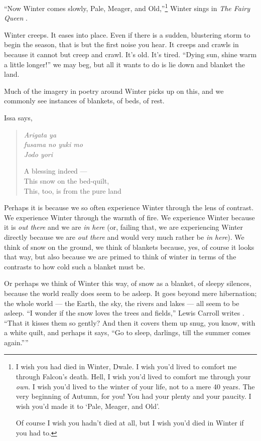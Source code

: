 \documentclass[12pt,oneside]{memoir}
\begin{document}
``Now Winter comes slowly, Pale, Meager, and Old,''\footnote{I wish you had died in Winter, Dwale. I wish you'd lived to comfort me through Falcon's death. Hell, I wish you'd lived to comfort me through your \emph{own}. I wish you'd lived to the winter of your life, not to a mere 40 years. The very beginning of Autumn, for you! You had your plenty and your paucity. I wish you'd made it to `Pale, Meager, and Old'.\par Of course I wish you hadn't died at all, but I wish you'd died in Winter if you had to.} Winter sings in \emph{The Fairy Queen} \parencite{purcell}.

Winter creeps. It eases into place. Even if there is a sudden, blustering storm to begin the season, that is but the first noise you hear. It creeps and crawls in because it cannot but creep and crawl. It's old. It's tired. ``Dying sun, shine warm a little longer!'' \parencite[206]{graves_poems} we may beg, but all it wants to do is lie down and blanket the land.

Much of the imagery in poetry around Winter picks up on this, and we commonly see instances of blankets, of beds, of rest.

Issa says,

\begin{verse}
\emph{Arigata ya} \\
\emph{fusama no yuki mo} \\
\emph{Jodo yori}

A blessing indeed --- \\
This snow on the bed-quilt, \\
This, too, is from the pure land

\parencite[46]{issa}
\end{verse}

Perhaps it is because we so often experience Winter through the lens of contrast. We experience Winter through the warmth of fire. We experience Winter because it is \emph{out there} and we are \emph{in here} (or, failing that, we are experiencing Winter directly because we are \emph{out there} and would very much rather be \emph{in here}). We think of snow on the ground, we think of blankets because, yes, of course it looks that way, but also because we are primed to think of winter in terms of the contrasts to how cold such a blanket must be.

Or perhaps we think of Winter this way, of snow as a blanket, of sleepy silences, because the world really does seem to be asleep. It goes beyond mere hibernation; the whole world --- the Earth, the sky, the rivers and lakes --- all seem to be asleep. ``I wonder if the snow loves the trees and fields,'' Lewis Carroll writes \parencite{carroll}. ``That it kisses them so gently? And then it covers them up snug, you know, with a white quilt, and perhaps it says, ``Go to sleep, darlings, till the summer comes again.''''
\end{document}
